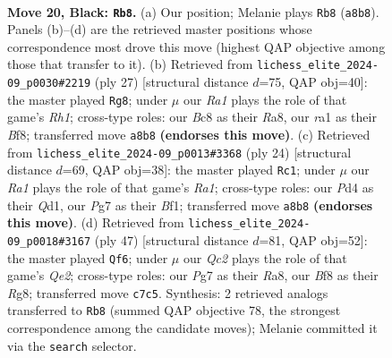 \documentclass[11pt]{article}
\begin{document}
\clearpage

\begin{figure}[p]\centering
\begin{subfigure}{0.46\textwidth}\centering
\resizebox{\linewidth}{!}{%
\newchessgame
\chessboard[
  setfen={r1b2b1r/2q1k1pp/1p6/p2Qp3/3p3P/8/PP3PP1/RNB1R1K1 b - - 3 20},
  showmover=false,
  pgfstyle=straightmove, color=movearrow, markmove={a8-b8}
]}
\caption{}
\end{subfigure}\hfill
\begin{subfigure}{0.46\textwidth}\centering
\resizebox{\linewidth}{!}{%
\newchessgame
\chessboard[
  setfen={r1b1kb1r/p4p1p/1qp1pQ2/3p4/8/3B4/PPP2PPP/RN2R1K1 b kq - 0 14},
  showmover=false,
  pgfstyle=straightmove, color=movearrow, markmove={h8-g8}
]}
\caption{}
\end{subfigure}
\\[4pt]
\begin{subfigure}{0.46\textwidth}\centering
\resizebox{\linewidth}{!}{%
\newchessgame
\chessboard[
  setfen={r3k1nr/1pp2ppp/4b3/4q3/1BP5/P7/4PPPP/R2QKB1R w KQkq - 0 13},
  showmover=false,
  pgfstyle=straightmove, color=movearrow, markmove={a1-c1}
]}
\caption{}
\end{subfigure}\hfill
\begin{subfigure}{0.46\textwidth}\centering
\resizebox{\linewidth}{!}{%
\newchessgame
\chessboard[
  setfen={r4kr1/pp1bq1pR/4p3/3pQ3/3p1P2/P7/1PP3PP/5RK1 b - - 4 24},
  showmover=false,
  pgfstyle=straightmove, color=movearrow, markmove={e7-f6}
]}
\caption{}
\end{subfigure}
\caption{\textbf{Move 20, Black: \texttt{Rb8}.} (a) Our position; Melanie plays \texttt{Rb8} (\texttt{a8b8}). Panels (b)--(d) are the retrieved master positions whose correspondence most drove this move (highest QAP objective among those that transfer to it). (b) Retrieved from \texttt{lichess\_elite\_2024-09\_p0030\#2219} (ply 27) [structural distance $d$=75, QAP obj=40]: the master played \texttt{Rg8}; under $\mu$ our \emph{Ra1} plays the role of that game's \emph{Rh1}; cross-type roles: our \emph{B}c8 as their \emph{R}a8, our \emph{r}a1 as their \emph{B}f8; transferred move \texttt{a8b8} \textbf{(endorses this move)}. (c) Retrieved from \texttt{lichess\_elite\_2024-09\_p0013\#3368} (ply 24) [structural distance $d$=69, QAP obj=38]: the master played \texttt{Rc1}; under $\mu$ our \emph{Ra1} plays the role of that game's \emph{Ra1}; cross-type roles: our \emph{P}d4 as their \emph{Q}d1, our \emph{P}g7 as their \emph{B}f1; transferred move \texttt{a8b8} \textbf{(endorses this move)}. (d) Retrieved from \texttt{lichess\_elite\_2024-09\_p0018\#3167} (ply 47) [structural distance $d$=81, QAP obj=52]: the master played \texttt{Qf6}; under $\mu$ our \emph{Qc2} plays the role of that game's \emph{Qe2}; cross-type roles: our \emph{P}g7 as their \emph{R}a8, our \emph{B}f8 as their \emph{R}g8; transferred move \texttt{c7c5}. Synthesis: 2 retrieved analogs transferred to \texttt{Rb8} (summed QAP objective 78, the strongest correspondence among the candidate moves); Melanie committed it via the \texttt{search} selector.}
\label{fig:thought-m39}
\end{figure}
\end{document}
